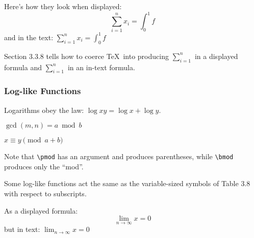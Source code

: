 \documentclass[twocolumn]{book}        %
\begin{document}
Here's how they look when displayed:
\[\sum_{i=1}^{n} x_{i} = \int_{0}^{1}f \]
and in the text:
\(\sum_{i=1}^{n} x_{i} = \int_{0}^{1}f \)

Section 3.3.8 tells how to coerce \TeX\ into producing \(\sum_{i=1}^{n}\) 
in a displayed formula and \(\sum_{i=1}^{n}\)  in an in-text formula.

\subsubsection{Log-like Functions}

Logarithms obey the law: \( \log xy = \log x + \log y \).

\( \gcd(m,n) = a \bmod b \) 

\( x \equiv y \pmod{a+b} \)

Note that \texttt{\textbackslash pmod} has an argument and produces parentheses, while 
\texttt{\textbackslash bmod} produces only the ``mod''.

Some log-like functions act the same as the variable-sized symbols of Table 3.8 with 
respect to subscripts.

As a displayed formula:
\[ \lim_{n \rightarrow \infty} x = 0 \]
but in text:
\( \lim_{n \rightarrow \infty} x = 0 \) 
\end{document}
